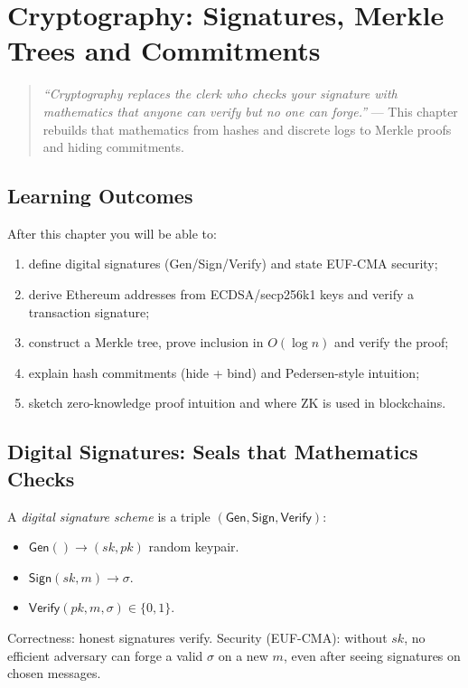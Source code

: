 \chapter{Cryptography: Signatures, Merkle Trees and Commitments}\label{ch:crypto}

\begin{quote}
\emph{``Cryptography replaces the clerk who checks your signature with mathematics that anyone can verify but no one can forge.''} --- This chapter rebuilds that mathematics from hashes and discrete logs to Merkle proofs and hiding commitments.
\end{quote}

\noindent{}
\vspace{0.4em}

\section*{Learning Outcomes}
After this chapter you will be able to:
\begin{enumerate}[label=(L\arabic*)]
    \item define digital signatures (Gen/Sign/Verify) and state EUF-CMA security;
    \item derive Ethereum addresses from ECDSA/secp256k1 keys and verify a transaction signature;
    \item construct a Merkle tree, prove inclusion in $O(\log n)$ and verify the proof;
    \item explain hash commitments (hide + bind) and Pedersen-style intuition;
    \item sketch zero-knowledge proof intuition and where ZK is used in blockchains.
\end{enumerate}

\section{Digital Signatures: Seals that Mathematics Checks}\label{sec:sigs}
A \emph{digital signature scheme} is a triple $(\mathsf{Gen},\mathsf{Sign},\mathsf{Verify})$:
\begin{itemize}[leftmargin=1.2em]
    \item $\mathsf{Gen}()\to(sk,pk)$ random keypair.
    \item $\mathsf{Sign}(sk,m)\to\sigma$.
    \item $\mathsf{Verify}(pk,m,\sigma)\in\{0,1\}$.
\end{itemize}
Correctness: honest signatures verify. Security (EUF-CMA): without $sk$, no efficient adversary can forge a valid $\sigma$ on a new $m$, even after seeing signatures on chosen messages.

